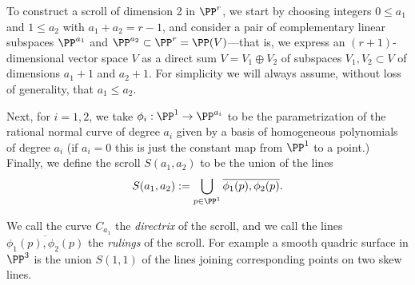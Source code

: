 To construct a scroll of dimension 2 in $\PP^r$, we start by choosing integers $0\leq a_1$ and  $1\leq a_2$ with $a_1 + a_2 = r-1$, and consider  a pair of complementary linear subspaces $\PP^{a_1}$ and $\PP^{a_2} \subset \PP^r = \PP(V)$---that is, we express an $(r+1)$-dimensional vector space $V$ as a direct sum $V =  V_1 \oplus V_2$ of subspaces $V_1, V_2 \subset V$ of dimensions $a_1+1$ and $a_2+1$. For simplicity we will always assume, without loss of
generality, that $a_{1}\leq a_{2}$.

Next, for $i=1,2$, we take $\phi_i : \PP^1 \to \PP^{a_i}$ to be the parametrization of the rational normal curve of degree $a_i$ given by a basis of homogeneous polynomials of degree $a_i$ (if $a_i = 0$ this is just the constant map from $\PP^1$ to a point.) Finally, we define the scroll $S(a_1, a_2)$ to be the union of the lines
$$
S(a_1,a_2) := \bigcup_{p\in \PP^1} \overline{\phi_1(p), \phi_2(p)}.
$$

We call the curve $C_{a_{1}}$ the \emph{directrix} of the scroll, and we call the lines $ \overline{\phi_1(p), \phi_2(p)}$ the \emph{rulings} of the scroll. For example a smooth quadric surface in $\PP^3$ is the union $S(1,1)$ of the lines joining corresponding points on two skew lines. 


